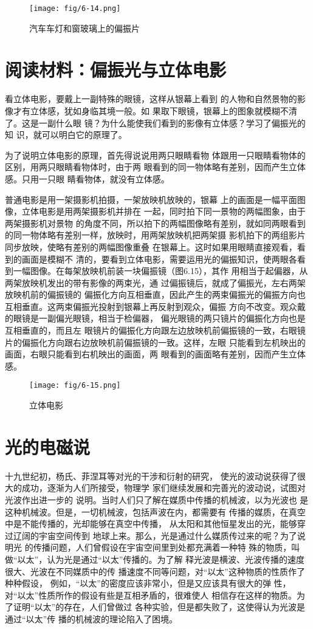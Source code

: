 \begin{figure}[htp]\centering
    \texttt{[image: fig/6-14.png]}
    \caption{汽车车灯和窗玻璃上的偏振片}
    \end{figure}

\section*{阅读材料：偏振光与立体电影}
看立体电影，要戴上一副特殊的眼镜，这样从银幕上看到
的人物和自然景物的影像才有立体感，犹如身临其境一般。如
果取下眼镜，银幕上的图象就模糊不清了。这是一副什么眼
镜？为什么能使我们看到的影像有立体感？学习了偏振光的知
识，就可以明白它的原理了。

为了说明立体电影的原理，首先得说说用两只眼睛看物
体跟用一只眼睛看物体的区别，用两只眼睛看物体时，由于两
眼看到的同一物体略有差别，因而产生立体感。只用一只眼
睛看物体，就没有立体感。

普通电影是用一架摄影机拍摄，一架放映机放映的，银幕
上的画面是一幅平面图像，立体电影是用两架摄影机并排在
一起，同时拍下同一景物的两幅图象，由于两架摄影机对景物
的角度不同，所以拍下的两幅图像略有差别，就如同两眼看到
的同一物体略有差别一样，放映时，用两架放映机把两架摄
影机拍下的两组影片同步放映，使略有差别的两幅图像重叠
在银幕上。这时如果用眼睛直接观看，看到的画面是模糊不
清的，要看到立体电影，需要运用光的偏振知识，使两眼各看
到一幅图像。在每架放映机前装一块偏振镜（图6.15），其作
用相当于起偏器，从两架放映机发出的带有影像的两束光，通
过偏振镜后，就成了偏振光，左右两架放映机前的偏振镜的
偏振化方向互相垂直，因此产生的两束偏振光的偏振方向也
互相垂直。这两束偏振光投射到银幕上再反射到观众，偏振
方向不改变。观众戴的眼镜是一副偏光眼镜，相当于检偏器，
偏光眼镜的两只镜片的偏振化方向也是互相垂直的，而且左
眼镜片的偏振化方向跟左边放映机前偏振镜的一致，右眼镜
片的偏振化方向跟右边放映机前偏振镜的一致。这样，左眼
只能看到左机映出的画面，右眼只能看到右机映出的画面，两
眼看到的画面略有差别，因而产生立体感。
\begin{figure}[htp]\centering
    \texttt{[image: fig/6-15.png]}
    \caption{立体电影}
    \end{figure}

\section{光的电磁说}
十九世纪初，杨氏、菲涅耳等对光的干涉和衍射的研究，
使光的波动说获得了很大的成功，逐渐为人们所接受，物理学
家们继续发展和完善光的波动说，试图对光波作出进一步的
说明。当时人们只了解在媒质中传播的机械波，以为光波也
是这种机械波。但是，一切机械波，包括声波在内，都需要有
传播的媒质，在真空中是不能传播的，光却能够在真空中传播，
从太阳和其他恒星发出的光，能够穿过辽阔的宇宙空间传到
地球上来。那么，光是通过什么媒质传过来的呢？为了说明光
的传播问题，人们曾假设在宇宙空间里到处都充满着一种特
殊的物质，叫做“以太”，认为光是通过“以太”传播的。为了解
释光波是横波、光波传播的速度很大、光波在不同媒质中的传
播速度不同等问题，对“以太”这种物质的性质作了种种假设，
例如，“以太”的密度应该非常小，但是又应该具有很大的弹
性，对“以太”性质所作的假设有些是互相矛盾的，很难使人
相信存在这样的物质。为了证明“以太”的存在，人们曾做过
各种实验，但是都失败了，这使得认为光波是通过“以太”传
播的机械波的理论陷入了困境。

